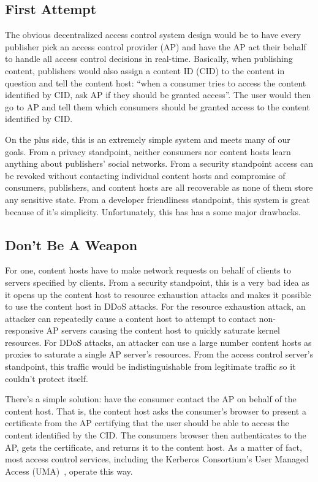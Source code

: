 \documentclass[pdftex,12pt,a4papaer]{report}
\begin{document}
\subsection{First Attempt}

The obvious decentralized access control system design would be to have every
publisher pick an access control provider (AP) and have the AP act their
behalf to handle all access control decisions in real-time. Basically, when
publishing content, publishers would also assign a content ID (CID) to the
content in question and tell the content host: ``when a consumer tries to access
the content identified by CID, ask AP if they should be granted access''. The
user would then go to AP and tell them which consumers should be granted access
to the content identified by CID.

On the plus side, this is an extremely simple system and meets many of our
goals. From a privacy standpoint, neither consumers nor content hosts learn
anything about publishers' social networks. From a security standpoint
access can be revoked without contacting individual content hosts and compromise
of consumers, publishers, and content hosts are all recoverable as none of
them store any sensitive state. From a developer friendliness standpoint, this
system is great because of it's simplicity. Unfortunately, this has has a some
major drawbacks.

\subsection{Don't Be A Weapon}

For one, content hosts have to make network requests on behalf of clients to
servers specified by clients. From a security standpoint, this is a very bad
idea as it opens up the content host to resource exhaustion attacks and makes it
possible to use the content host in DDoS attacks. For the resource exhaustion
attack, an attacker can repeatedly cause a content host to attempt to contact
non-responsive AP servers causing the content host to quickly saturate kernel
resources. For DDoS attacks, an attacker can use a large number content hosts as
proxies to saturate a single AP server's resources. From the access control
server's standpoint, this traffic would be indistinguishable from legitimate
traffic so it couldn't protect itself.

There's a simple solution: have the consumer contact the AP on behalf of the
content host. That is, the content host asks the consumer's browser to present a
certificate from the AP certifying that the user should be able to access the
content identified by the CID. The consumers browser then authenticates to the
AP, gets the certificate, and returns it to the content host. As a matter of
fact, most access control services, including the Kerberos Consortium's User
Managed Access (UMA)~\cite{uma}, operate this way.
\end{document}

